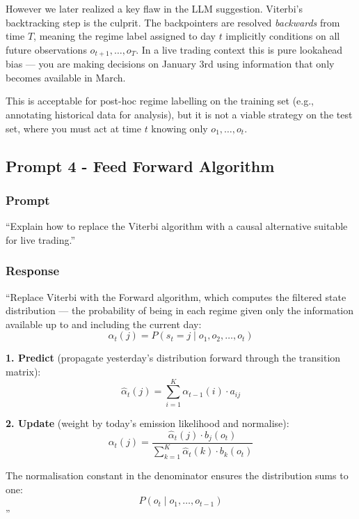 \documentclass{article}
\begin{document}
However we later realized a key flaw in the LLM suggestion. Viterbi's backtracking step is the culprit. The backpointers are resolved \emph{backwards} from time $T$, meaning the regime label assigned to day $t$ implicitly conditions on all future observations $o_{t+1}, \ldots, o_T$. In a live trading context this is pure lookahead bias --- you are making decisions on January 3rd using information that only becomes available in March.

This is acceptable for post-hoc regime labelling on the training set (e.g., annotating historical data for analysis), but it is not a viable strategy on the test set, where you must act at time $t$ knowing only $o_1, \ldots, o_t$.

\subsection{Prompt 4 - Feed Forward Algorithm}

\subsubsection{Prompt}
``Explain how to replace the Viterbi algorithm with a causal alternative suitable for live trading.''

\subsubsection{Response}
``Replace Viterbi with the Forward algorithm, which computes the filtered state distribution --- the probability of being in each regime given only the information available up to and including the current day:
\[
\alpha_t(j) = P(s_t = j \mid o_1, o_2, \ldots, o_t)
\]

\textbf{1. Predict} (propagate yesterday's distribution forward through the transition matrix):
\[
\hat{\alpha}_t(j) = \sum_{i=1}^{K} \alpha_{t-1}(i) \cdot a_{ij}
\]

\textbf{2. Update} (weight by today's emission likelihood and normalise):
\[
\alpha_t(j) = \frac{\hat{\alpha}_t(j) \cdot b_j(o_t)}{\sum_{k=1}^{K} \hat{\alpha}_t(k) \cdot b_k(o_t)}
\]

The normalisation constant in the denominator ensures the distribution sums to one:
\[
P(o_t \mid o_1, \ldots, o_{t-1})
\]''
\end{document}
